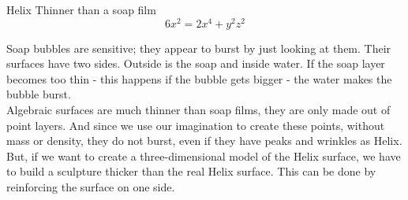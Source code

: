 \begin{surferPage}{Helix}
Thinner than a soap film\\
  \smallskip
\[6x^2	= 2x^4	+ y^2	z^2\]

\singlespacing
Soap bubbles are sensitive; they appear to burst by just looking at them. Their surfaces have two sides. Outside is the soap and inside water. If the soap layer becomes too thin - this happens if the bubble gets bigger - the water makes the bubble burst.\\
\vspace{0,3cm}
Algebraic surfaces are much thinner than soap films, they are only made out of point layers. And since we use our imagination to create these points, without mass or density, they do not burst, even if they have peaks and wrinkles as Helix.\\
\vspace{0,3cm}
But, if we want to create a three-dimensional model of the Helix surface, we have to build a sculpture thicker than the real Helix surface. This can be done by reinforcing the surface on one side.
\end{surferPage}
